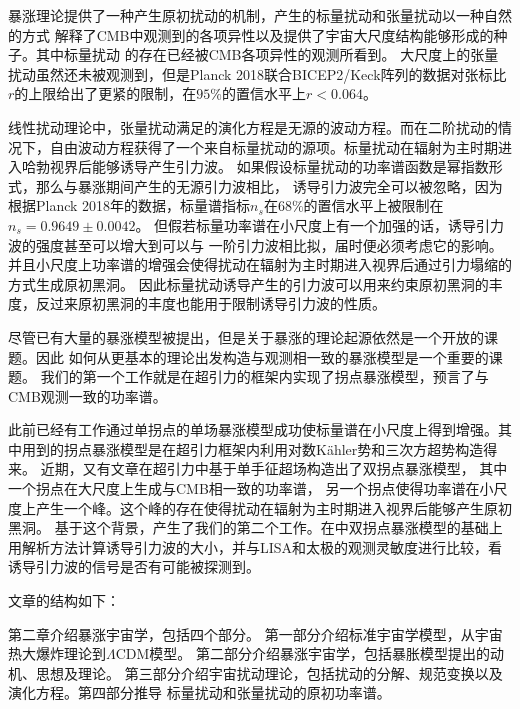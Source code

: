暴涨理论提供了一种产生原初扰动的机制，产生的标量扰动和张量扰动以一种自然的方式
解释了CMB中观测到的各项异性以及提供了宇宙大尺度结构能够形成的种子。其中标量扰动
的存在已经被CMB各项异性的观测所看到\citep{akrami2018planck}。
大尺度上的张量扰动虽然还未被观测到，但是Planck
2018联合BICEP2/Keck阵列的数据对张标比$r$的上限给出了更紧的限制，在$95\%$的置信水平上$r<0.064$。

线性扰动理论中，张量扰动满足的演化方程是无源的波动方程。而在二阶扰动的情况下，自由波动方程获得了一个来自标量扰动的源项\citep{matarrese1998relativistic,acquaviva2002second}。标量扰动在辐射为主时期进入哈勃视界后能够诱导产生引力波。
如果假设标量扰动的功率谱函数是幂指数形式，那么与暴涨期间产生的无源引力波相比，
诱导引力波完全可以被忽略\citep{ananda2007cosmological,baumann2007gravitational}，因为根据Planck
2018年的数据，标量谱指标$n_{s}$在$68\%$的置信水平上被限制在$n_{s}=0.9649\pm 0.0042$。
但假若标量功率谱在小尺度上有一个加强的话，诱导引力波的强度甚至可以增大到可以与
一阶引力波相比拟，届时便必须考虑它的影响\citep{assadullahi2009gravitational,alabidi2013observable,alabidi2012observable,chen2019pulsar,cai2019gravitational,inomata2019gravitational,cai2019universal}。并且小尺度上功率谱的增强会使得扰动在辐射为主时期进入视界后通过引力塌缩的方式生成原初黑洞\citep{garcia1996density,clesse2015massive,yokoyama1995formation,dalianis2019primordial,gao2018primordial,di2018primordial,garcia2017primordial,garcia2016gravitational}。
因此标量扰动诱导产生的引力波可以用来约束原初黑洞的丰度，反过来原初黑洞的丰度也能用于限制诱导引力波的性质。

尽管已有大量的暴涨模型被提出，但是关于暴涨的理论起源依然是一个开放的课题。因此
如何从更基本的理论出发构造与观测相一致的暴涨模型是一个重要的课题。
我们的第一个工作就是在超引力的框架内实现了拐点暴涨模型，预言了与CMB观测一致的功率谱。

此前已经有工作\citep{garcia1702phys}通过单拐点的单场暴涨模型成功使标量谱在小尺度上得到增强。其中用到的拐点暴涨模型是在超引力框架内利用对数K\"ahler势和三次方超势构造得来\citep{gao2015inflection}。
近期，又有文章在超引力中基于单手征超场构造出了双拐点暴涨模型\citep{gao2018primordial}，
其中一个拐点在大尺度上生成与CMB相一致的功率谱，
另一个拐点使得功率谱在小尺度上产生一个峰。这个峰的存在使得扰动在辐射为主时期进入视界后能够产生原初黑洞。
基于这个背景，产生了我们的第二个工作。在\citep{gao2018primordial}中双拐点暴涨模型的基础上
用解析方法计算诱导引力波的大小，并与LISA和太极的观测灵敏度进行比较，看诱导引力波的信号是否有可能被探测到。

文章的结构如下：

第二章介绍暴涨宇宙学，包括四个部分。
第一部分介绍标准宇宙学模型，从宇宙热大爆炸理论到$\Lambda$CDM模型。
第二部分介绍暴涨宇宙学，包括暴胀模型提出的动机、思想及理论。
第三部分介绍宇宙扰动理论，包括扰动的分解、规范变换以及演化方程。第四部分推导
标量扰动和张量扰动的原初功率谱。

